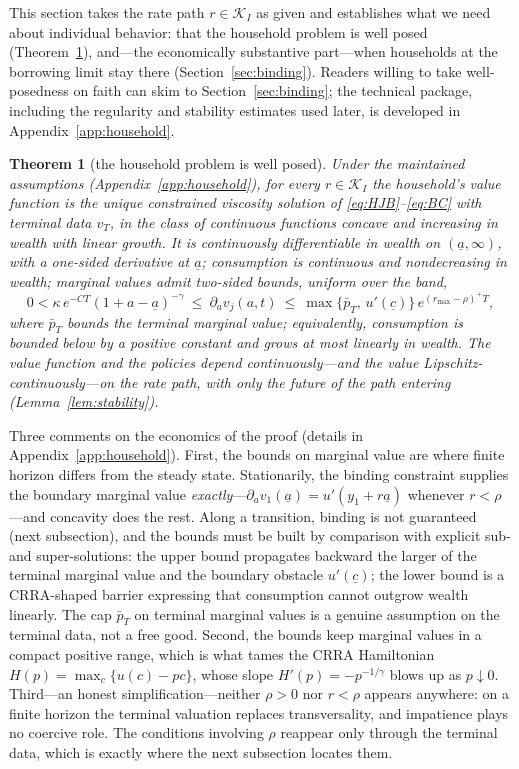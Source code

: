 \documentclass[11pt]{article}
\newtheorem{theorem}{Theorem}[section]
\theoremstyle{definition}
\theoremstyle{remark}
\newcommand{\ubar}[1]{\underline{#1}}
\newcommand{\Kcal}{\mathcal{K}}
\newcommand{\ubc}{\ubar{c}}
\newcommand{\uba}{\ubar{a}}
\begin{document}
This section takes the rate path $r\in\Kcal_I$ as given and
establishes what we need about individual behavior: that the household
problem is well posed (Theorem~\ref{thm:household}), and---the
economically substantive part---when households at the borrowing
limit stay there (Section~\ref{sec:binding}). Readers willing to take
well-posedness on faith can skim to Section~\ref{sec:binding}; the
technical package, including the regularity and stability estimates
used later, is developed in Appendix~\ref{app:household}.

\begin{theorem}[the household problem is well posed]
\label{thm:household}
Under the maintained assumptions (Appendix~\ref{app:household}), for
every $r\in\Kcal_I$ the household's value function is the unique
constrained viscosity solution of \eqref{eq:HJB}--\eqref{eq:BC} with
terminal data $v_T$, in the class of continuous functions concave and
increasing in wealth with linear growth. It is continuously
differentiable in wealth on $(\uba,\infty)$, with a one-sided
derivative at $\uba$; consumption is continuous and nondecreasing in
wealth; marginal values admit two-sided bounds, uniform over the
band,
\[
0<\kappa\,e^{-CT}(1+a-\uba)^{-\gamma}\ \le\ \partial_a v_j(a,t)\ \le\
\max\{\bar p_T,\,u'(\ubc)\}\,e^{(r_{\max}-\rho)^+T},
\]
where $\bar p_T$ bounds the terminal marginal value; equivalently,
consumption is bounded below by a positive constant and grows at most
linearly in wealth. The value function and the policies depend
continuously---and the value Lipschitz-continuously---on the rate
path, with only the \emph{future} of the path entering
(Lemma~\ref{lem:stability}).
\end{theorem}

Three comments on the economics of the proof (details in
Appendix~\ref{app:household}). First, the bounds on marginal value are
where finite horizon differs from the steady state. Stationarily, the
binding constraint supplies the boundary marginal value
\emph{exactly}---$\partial_a v_1(\uba)=u'(y_1+r\uba)$ whenever
$r<\rho$---and concavity does the rest. Along a transition, binding is
not guaranteed (next subsection), and the bounds must be built by
comparison with explicit sub- and super-solutions: the upper bound
propagates backward the larger of the terminal marginal value and the
boundary obstacle $u'(\ubc)$; the lower bound is a CRRA-shaped barrier
expressing that consumption cannot outgrow wealth linearly. The cap
$\bar p_T$ on terminal marginal values is a genuine assumption on the
terminal data, not a free good. Second, the bounds keep marginal
values in a compact positive range, which is what tames the CRRA
Hamiltonian $H(p)=\max_c\{u(c)-pc\}$, whose slope
$H'(p)=-p^{-1/\gamma}$ blows up as $p\downarrow0$. Third---an honest
simplification---neither $\rho>0$ nor $r<\rho$ appears anywhere: on a
finite horizon the terminal valuation replaces transversality, and
impatience plays no coercive role. The conditions involving $\rho$
reappear only through the terminal data, which is exactly where the
next subsection locates them.
\end{document}
